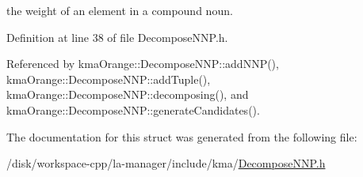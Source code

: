 the weight of an element in a compound noun. 



Definition at line 38 of file DecomposeNNP.h.

Referenced by kmaOrange::DecomposeNNP::addNNP(), kmaOrange::DecomposeNNP::addTuple(), kmaOrange::DecomposeNNP::decomposing(), and kmaOrange::DecomposeNNP::generateCandidates().

The documentation for this struct was generated from the following file:\begin{CompactItemize}
\item 
/disk/workspace-cpp/la-manager/include/kma/\hyperlink{DecomposeNNP_8h}{DecomposeNNP.h}\end{CompactItemize}

